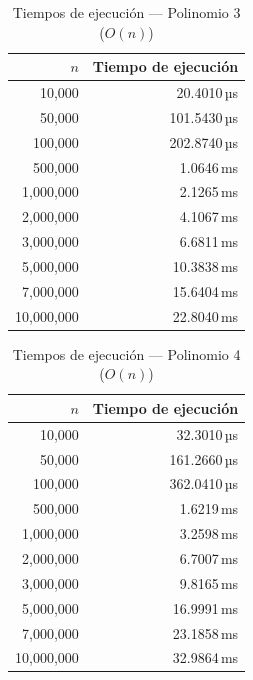 \documentclass{article}
\begin{document}
\begin{table}[ht]
  \centering
  \caption{Tiempos de ejecución — Polinomio 3 ($O(n)$)}
  \label{tab:polinomio3}
  \begin{tabular}{rr}
    \toprule
    $n$ & Tiempo de ejecución \\
    \midrule
    10,000 & 20.4010\,µs \\
    50,000 & 101.5430\,µs \\
    100,000 & 202.8740\,µs \\
    500,000 & 1.0646\,ms \\
    1,000,000 & 2.1265\,ms \\
    2,000,000 & 4.1067\,ms \\
    3,000,000 & 6.6811\,ms \\
    5,000,000 & 10.3838\,ms \\
    7,000,000 & 15.6404\,ms \\
    10,000,000 & 22.8040\,ms \\
    \bottomrule
  \end{tabular}
\end{table}

\begin{table}[ht]
  \centering
  \caption{Tiempos de ejecución — Polinomio 4 ($O(n)$)}
  \label{tab:polinomio4}
  \begin{tabular}{rr}
    \toprule
    $n$ & Tiempo de ejecución \\
    \midrule
    10,000 & 32.3010\,µs \\
    50,000 & 161.2660\,µs \\
    100,000 & 362.0410\,µs \\
    500,000 & 1.6219\,ms \\
    1,000,000 & 3.2598\,ms \\
    2,000,000 & 6.7007\,ms \\
    3,000,000 & 9.8165\,ms \\
    5,000,000 & 16.9991\,ms \\
    7,000,000 & 23.1858\,ms \\
    10,000,000 & 32.9864\,ms \\
    \bottomrule
  \end{tabular}
\end{table}
\end{document}
